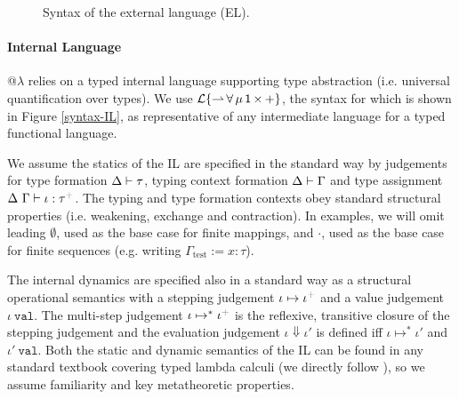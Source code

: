 \documentclass[10pt,preprint]{sigplanconf}
\newcommand{\moutput}{^{\color{gray}+}}
\begin{document}
\begin{figure}[t]
\small
\hspace{-5px}
\caption{Syntax of the external language (EL).}\label{syntax-EL}
\end{figure}



\paragraph{Internal Language} 
@$\lambda$ relies on a typed internal language supporting type abstraction (i.e. universal quantification over types). We use {$\mathcal{L}\{{\rightharpoonup}\,{\forall}\,{\mu}\,{{\sf 1}}\,{\times}\,{+}\}$}, the syntax for which is shown in Figure \ref{syntax-IL}, as representative of any intermediate language for a typed functional language. %

We assume the statics of the IL are specified in the standard way by judgements for  type formation {$\Delta \vdash \tau$}, typing context formation { $\Delta \vdash \Gamma$} and type assignment {$\iDelta~\iGamma \vdash \iota : \tau\moutput$}. The typing and type formation contexts obey standard structural properties (i.e. weakening, exchange and contraction). In examples, we will omit leading $\emptyset$, used as the base case for finite mappings, and $\cdot$, used as the base case for finite sequences (e.g. writing $\Gamma_\text{test} := x : \tau$). 

The internal dynamics are specified also in a standard way as a structural operational semantics with a stepping judgement {\small $\iota \mapsto \iota\moutput$} and a value judgement {$\iota~\mathtt{val}$}. The multi-step judgement $\iota \mapsto^{*} \iota\moutput$ is the reflexive, transitive closure of the stepping judgement and the evaluation judgement $\iota \Downarrow \iota'$ is defined iff $\iota \mapsto^{*} \iota'$ and $\iota'~\mathtt{val}$. Both the static and dynamic semantics of the IL can be found in any standard textbook covering typed lambda calculi (we directly follow \cite{pfpl}), so we assume familiarity and key metatheoretic properties.

\end{document}
